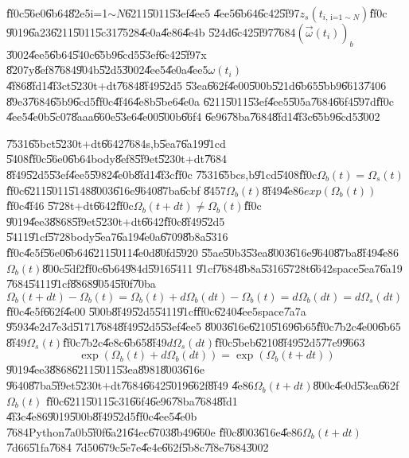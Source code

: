 \documentclass[12pt]{article}
\begin{document}
\U{ff0c}\U{56e0}\U{6b64}\U{82e5}i=1$\sim N$\U{6211}\U{5011}\U{53ef}\U{4ee5}%
\U{4ee5}\U{6b64}\U{6c42}\U{5f97}$z_{s}(t_{i\text{, i=1}\sim N})$\U{ff0c}%
\U{9019}\U{6a23}\U{6211}\U{5011}\U{5c31}\U{7528}\U{4e0a}\U{4e86}\U{4e4b}%
\U{524d}\U{6c42}\U{5f97}\U{7684}$\left( \vec{\omega}(t_{i})\right) _{b}$%
\U{3002}\U{4ee5}\U{6b64}\U{540c}\U{65b9}\U{6cd5}\U{53ef}\U{6c42}\U{5f97}x%
\U{8207}y\U{8ef8}\U{7684}\U{904b}\U{52d5}\U{3002}\U{4ee5}\U{4e0a}\U{4ee5}$%
\omega (t_{i})$\U{4f86}\U{8fd1}\U{4f3c}t\U{5230}t+dt\U{7684}\U{8f49}\U{52d5}%
\U{53ea}\U{662f}\U{4e00}\U{500b}\U{521d}\U{6b65}\U{5bb9}\U{6613}\U{7406}%
\U{89e3}\U{7684}\U{65b9}\U{6cd5}\U{ff0c}\U{4f46}\U{4e8b}\U{5be6}\U{4e0a}%
\U{6211}\U{5011}\U{53ef}\U{4ee5}\U{505a}\U{7684}\U{66f4}\U{597d}\U{ff0c}%
\U{4ee5}\U{4e0b}\U{5c07}\U{8aaa}\U{660e}\U{53e6}\U{4e00}\U{500b}\U{66f4}%
\U{6e96}\U{78ba}\U{7684}\U{8fd1}\U{4f3c}\U{65b9}\U{6cd5}\U{3002}

\U{7531}\U{65bc}t\U{5230}t+dt\U{6642}\U{7684}s,b\U{5ea7}\U{6a19}\U{91cd}%
\U{5408}\U{ff0c}\U{56e0}\U{6b64}body\U{8ef8}\U{5f9e}t\U{5230}t+dt\U{7684}%
\U{8f49}\U{52d5}\U{53ef}\U{4ee5}\U{5982}\U{4e0b}\U{8fd1}\U{4f3c}\U{ff0c}%
\U{7531}\U{65bc}s,b\U{91cd}\U{5408}\U{ff0c}$\Omega _{b}(t)=\Omega _{s}(t)$%
\U{ff0c}\U{6211}\U{5011}\U{5148}\U{8003}\U{616e}\U{9640}\U{87ba}\U{6cbf}%
\U{8457}$\Omega _{b}(t)$\U{8f49}\U{4e86}$exp(\Omega _{b}(t))$\U{ff0c}\U{4f46}%
\U{5728}t+dt\U{6642}\U{ff0c}$\Omega _{b}(t+dt)\neq \Omega _{b}(t)$\U{ff0c}%
\U{9019}\U{4ee3}\U{8868}\U{5f9e}t\U{5230}t+dt\U{6642}\U{ff0c}\U{8f49}\U{52d5}%
\U{5411}\U{91cf}\U{5728}body\U{5ea7}\U{6a19}\U{4e0a}\U{6709}\U{8b8a}\U{5316}%
\U{ff0c}\U{4e5f}\U{56e0}\U{6b64}\U{6211}\U{5011}\U{4e0d}\U{80fd}\U{5920}%
\U{55ae}\U{50b3}\U{53ea}\U{8003}\U{616e}\U{9640}\U{87ba}\U{8f49}\U{4e86}$%
\Omega _{b}(t)$\U{800c}\U{5df2}\U{ff0c}\U{6b64}\U{984d}\U{5916}\U{5411}%
\U{91cf}\U{7684}\U{8b8a}\U{5316}\U{5728}t\U{6642}space\U{5ea7}\U{6a19}%
\U{7684}\U{5411}\U{91cf}\U{8868}\U{9054}\U{5f0f}\U{70ba}$\Omega
_{b}(t+dt)-\Omega _{b}(t)=\Omega _{b}(t)+d\Omega _{b}(dt)-\Omega
_{b}(t)=d\Omega _{b}(dt)=d\Omega _{s}(dt)$\U{ff0c}\U{4e5f}\U{662f}\U{4e00}%
\U{500b}\U{8f49}\U{52d5}\U{5411}\U{91cf}\U{ff0c}\U{6240}\U{4ee5}space\U{7a7a}%
\U{9593}\U{4e2d}\U{7e3d}\U{5171}\U{7684}\U{8f49}\U{52d5}\U{53ef}\U{4ee5}%
\U{8003}\U{616e}\U{6210}\U{5169}\U{6b65}\U{ff0c}\U{7b2c}\U{4e00}\U{6b65}%
\U{8f49}$\Omega _{s}(t)$\U{ff0c}\U{7b2c}\U{4e8c}\U{6b65}\U{8f49}$d\Omega
_{s}(dt)$\U{ff0c}\U{5beb}\U{6210}\U{8f49}\U{52d5}\U{77e9}\U{9663}%
\begin{equation}
\exp (\Omega _{b}(t)+d\Omega _{b}(dt))=\exp (\Omega _{b}(t+dt))
\end{equation}%
\U{9019}\U{4ee3}\U{8868}\U{6211}\U{5011}\U{53ea}\U{8981}\U{8003}\U{616e}%
\U{9640}\U{87ba}\U{5f9e}t\U{5230}t+dt\U{7684}\U{6642}\U{5019}\U{662f}\U{8f49}%
\U{4e86}$\Omega _{b}(t+dt)$\U{800c}\U{4e0d}\U{53ea}\U{662f}$\Omega _{b}(t)$%
\U{ff0c}\U{6211}\U{5011}\U{5c31}\U{66f4}\U{6e96}\U{78ba}\U{7684}\U{8fd1}%
\U{4f3c}\U{4e86}\U{9019}\U{500b}\U{8f49}\U{52d5}\U{ff0c}\U{4ee5}\U{4e0b}%
\U{7684}Python\U{7a0b}\U{5f0f}\U{6a21}\U{64ec}\U{6703}\U{8b49}\U{660e}%
\U{ff0c}\U{8003}\U{616e}\U{4e86}$\Omega _{b}(t+dt)$\U{7d66}\U{51fa}\U{7684}%
\U{7d50}\U{679c}\U{5e7e}\U{4e4e}\U{662f}\U{5b8c}\U{7f8e}\U{7684}\U{3002}
\end{document}
